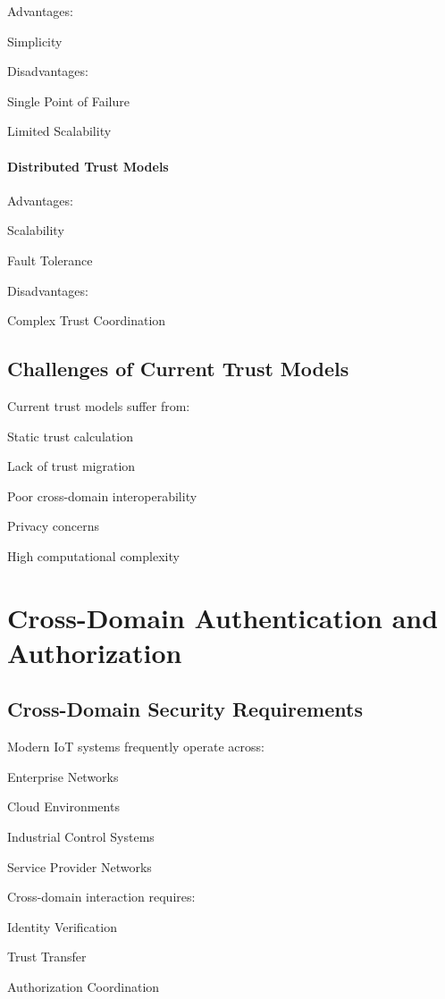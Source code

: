Advantages:


Simplicity


Disadvantages:


Single Point of Failure


Limited Scalability


\paragraph{Distributed Trust Models}

Advantages:


Scalability


Fault Tolerance


Disadvantages:


Complex Trust Coordination


\subsection{Challenges of Current Trust Models}

Current trust models suffer from:


Static trust calculation


Lack of trust migration


Poor cross-domain interoperability


Privacy concerns


High computational complexity


\section{Cross-Domain Authentication and Authorization}

\subsection{Cross-Domain Security Requirements}

Modern IoT systems frequently operate across:


Enterprise Networks


Cloud Environments


Industrial Control Systems


Service Provider Networks


Cross-domain interaction requires:


Identity Verification


Trust Transfer


Authorization Coordination


